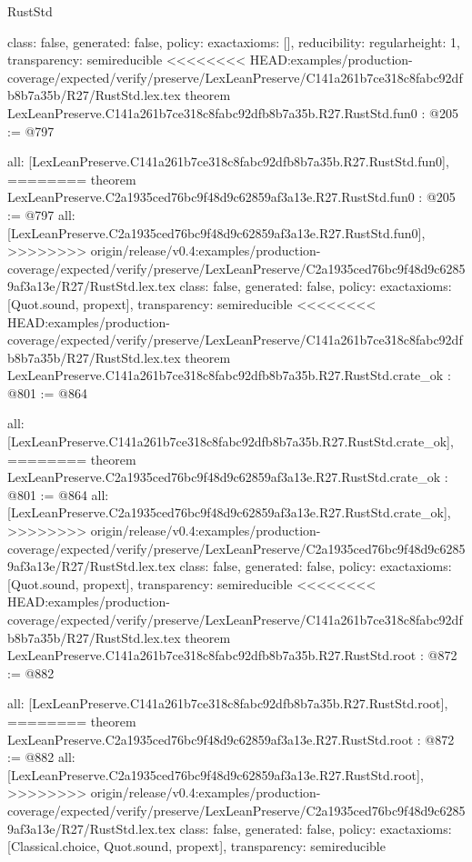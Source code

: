\begin{lexlean}{RustStd}
\begin{coremodule}
{\begin{coremodule}
{{{  class: false,
  generated: false,
  policy: exact{axioms: []},
  reducibility: regular{height: 1},
  transparency: semireducible
}
<<<<<<<< HEAD:examples/production-coverage/expected/verify/preserve/LexLeanPreserve/C141a261b7ce318c8fabc92dfb8b7a35b/R27/RustStd.lex.tex
theorem LexLeanPreserve.C141a261b7ce318c8fabc92dfb8b7a35b.R27.RustStd.fun0 : @205 := @797 {
  all: [LexLeanPreserve.C141a261b7ce318c8fabc92dfb8b7a35b.R27.RustStd.fun0],
========
theorem LexLeanPreserve.C2a1935ced76bc9f48d9c62859af3a13e.R27.RustStd.fun0 : @205 := @797 {
  all: [LexLeanPreserve.C2a1935ced76bc9f48d9c62859af3a13e.R27.RustStd.fun0],
>>>>>>>> origin/release/v0.4:examples/production-coverage/expected/verify/preserve/LexLeanPreserve/C2a1935ced76bc9f48d9c62859af3a13e/R27/RustStd.lex.tex
  class: false,
  generated: false,
  policy: exact{axioms: [Quot.sound, propext]},
  transparency: semireducible
}
<<<<<<<< HEAD:examples/production-coverage/expected/verify/preserve/LexLeanPreserve/C141a261b7ce318c8fabc92dfb8b7a35b/R27/RustStd.lex.tex
theorem LexLeanPreserve.C141a261b7ce318c8fabc92dfb8b7a35b.R27.RustStd.crate_ok : @801 := @864 {
  all: [LexLeanPreserve.C141a261b7ce318c8fabc92dfb8b7a35b.R27.RustStd.crate_ok],
========
theorem LexLeanPreserve.C2a1935ced76bc9f48d9c62859af3a13e.R27.RustStd.crate_ok : @801 := @864 {
  all: [LexLeanPreserve.C2a1935ced76bc9f48d9c62859af3a13e.R27.RustStd.crate_ok],
>>>>>>>> origin/release/v0.4:examples/production-coverage/expected/verify/preserve/LexLeanPreserve/C2a1935ced76bc9f48d9c62859af3a13e/R27/RustStd.lex.tex
  class: false,
  generated: false,
  policy: exact{axioms: [Quot.sound, propext]},
  transparency: semireducible
}
<<<<<<<< HEAD:examples/production-coverage/expected/verify/preserve/LexLeanPreserve/C141a261b7ce318c8fabc92dfb8b7a35b/R27/RustStd.lex.tex
theorem LexLeanPreserve.C141a261b7ce318c8fabc92dfb8b7a35b.R27.RustStd.root : @872 := @882 {
  all: [LexLeanPreserve.C141a261b7ce318c8fabc92dfb8b7a35b.R27.RustStd.root],
========
theorem LexLeanPreserve.C2a1935ced76bc9f48d9c62859af3a13e.R27.RustStd.root : @872 := @882 {
  all: [LexLeanPreserve.C2a1935ced76bc9f48d9c62859af3a13e.R27.RustStd.root],
>>>>>>>> origin/release/v0.4:examples/production-coverage/expected/verify/preserve/LexLeanPreserve/C2a1935ced76bc9f48d9c62859af3a13e/R27/RustStd.lex.tex
  class: false,
  generated: false,
  policy: exact{axioms: [Classical.choice, Quot.sound, propext]},
  transparency: semireducible
}

}}}}}
\end{coremodule}}
\end{coremodule}
\end{lexlean}

